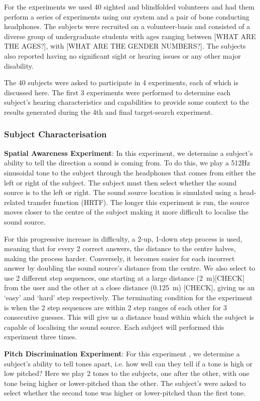 \documentclass[format=sigconf, review=true, screen=true, anonymous=true]{acmart}
\begin{document}
For the experiments we used 40 sighted and blindfolded volunteers and had them perform a series of experiments using our system and a pair of bone conducting headphones. The subjects were recruited on a volunteer-basis and consisted of a diverse group of undergraduate students with ages ranging between [WHAT ARE THE AGES?], with [WHAT ARE THE GENDER NUMBERS?]. The subjects also reported having no significant sight or hearing issues or any other major disability. 

The 40 subjects were asked to participate in 4 experiments, each of which is discussed here. The first 3 experiments were performed to determine each subject's hearing characteristics and capabilities to provide some context to the results generated during the 4th and final target-search experiment. 

\subsubsection{Subject Characterisation}\hfill

\textbf{Spatial Awareness Experiment}: In this experiment, we determine a subject's ability to tell the direction a sound is coming from. To do this, we play a 512Hz sinusoidal tone to the subject through the headphones that comes from either the left or right of the subject. The subject must then select whether the sound source is to the left or right. The sound source location is simulated using a head-related transfer function (HRTF). The longer this experiment is run, the source moves closer to the centre of the subject making it more difficult to localise the sound source. 

For this progressive increase in difficulty, a 2-up, 1-down step process is used, meaning that for every 2 correct answers, the distance to the centre halves, making the process harder. Conversely, it becomes easier for each incorrect answer by doubling the sound source's distance from the centre. We also select to use 2 different step sequences, one starting at a large distance (\SI{2}{\m})[CHECK] from the user and the other at a close distance (\SI{0.125}{\m}) [CHECK], giving us an `easy' and `hard' step respectively. The terminating condition for the experiment is when the 2 step sequences are within 2 step ranges of each other for 3 consecutive guesses. This will give us a distance band within which the subject is capable of localising the sound source. Each subject will performed this experiment three times. 

\textbf{Pitch Discrimination Experiment}: For this experiment , we determine a subject's ability to tell tones apart, i.e. how well can they tell if a tone is high or low pitched? Here we play 2 tones to the subjects, one after the other, with one tone being higher or lower-pitched than the other. The subject's were asked to select whether the second tone was higher or lower-pitched than the first tone.
\end{document}
